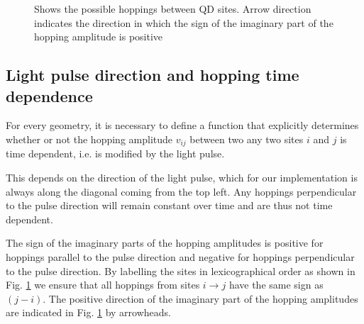 \begin{figure}[!hbt]
\begin{minipage}[b]{.48\textwidth}
    \caption{Shows the possible hoppings between QD sites. Arrow direction indicates the direction in which the sign of the imaginary part of the hopping amplitude is positive}
    \label{fig:qd_hoppings}
    \end{minipage}
\end{figure}

 \subsection{Light pulse direction and hopping time dependence}
For every geometry, it is necessary to define a function that explicitly determines whether or not the hopping amplitude $v_{ij}$ between two any two sites $i$ and $j$ is time dependent, i.e. is modified by the light pulse.
\medskip

This depends on the direction of the light pulse, which for our implementation is always along the diagonal coming from the top left. Any hoppings perpendicular to the pulse direction will remain constant over time and are thus not time dependent.
\medskip

The sign of the imaginary parts of the hopping amplitudes is positive for hoppings parallel to the pulse direction and negative for hoppings perpendicular to the pulse direction. By labelling the sites in lexicographical order as shown in Fig. \ref{fig:qd_hoppings} we ensure that all hoppings from sites $i\to j$ have the same sign as $(j-i)$. The positive direction of the imaginary part of the hopping amplitudes are indicated in Fig. \ref{fig:qd_hoppings} by arrowheads.


